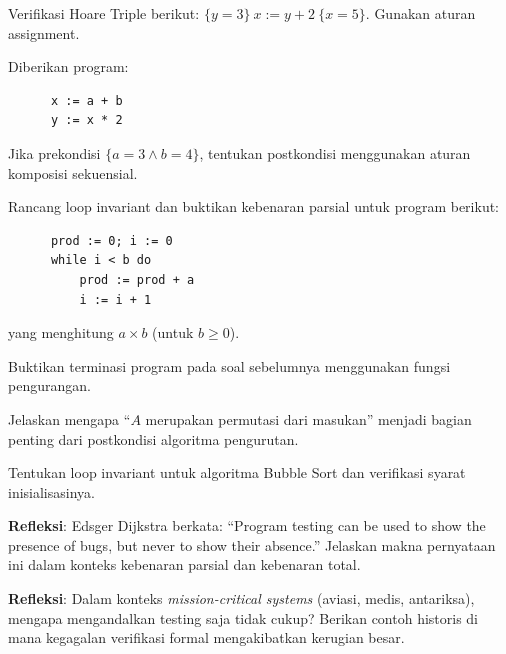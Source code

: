 \documentclass[../main]{subfiles}
\begin{document}

\begin{latihan}
  \item Verifikasi Hoare Triple berikut: $\{y = 3\}\ x := y + 2\ \{x = 5\}$. Gunakan aturan assignment.
  \item Diberikan program:
  \begin{verbatim}
      x := a + b
      y := x * 2
  \end{verbatim}
  Jika prekondisi $\{a = 3 \wedge b = 4\}$, tentukan postkondisi menggunakan aturan komposisi sekuensial.
  \item Rancang loop invariant dan buktikan kebenaran parsial untuk program berikut:
  \begin{verbatim}
      prod := 0; i := 0
      while i < b do
          prod := prod + a
          i := i + 1
  \end{verbatim}
  yang menghitung $a \times b$ (untuk $b \geq 0$).
  \item Buktikan terminasi program pada soal sebelumnya menggunakan fungsi pengurangan.
  \item Jelaskan mengapa ``$A$ merupakan permutasi dari masukan'' menjadi bagian penting dari postkondisi algoritma pengurutan.
  \item Tentukan loop invariant untuk algoritma Bubble Sort dan verifikasi syarat inisialisasinya.
  \item \textbf{Refleksi}: Edsger Dijkstra berkata: ``Program testing can be used to show the presence of bugs, but never to show their absence.'' Jelaskan makna pernyataan ini dalam konteks kebenaran parsial dan kebenaran total.
  \item \textbf{Refleksi}: Dalam konteks \textit{mission-critical systems} (aviasi, medis, antariksa), mengapa mengandalkan testing saja tidak cukup? Berikan contoh historis di mana kegagalan verifikasi formal mengakibatkan kerugian besar.
\end{latihan}

\end{document}
